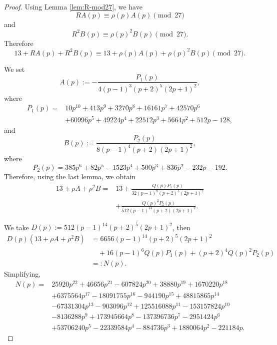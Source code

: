 \documentclass[10pt,a4paper]{amsart}
\begin{document}
\begin{proof}
Using Lemma \ref{lem:R-mod27}, we have
\begin{equation*}
RA(p)\equiv\rho(p)A(p)\pmod{27}
\end{equation*}
and
\begin{equation*}
R^2B(p)\equiv\rho(p)^2B(p)\pmod{27}.
\end{equation*}
Therefore
\begin{equation*}
13+RA(p)+R^2B(p)
\equiv
13+\rho(p)A(p)+\rho(p)^2B(p)
\pmod{27}.
\end{equation*}

We set
\begin{equation*}
A(p):=-\frac{P_1(p)}{4(p-1)^3(p+2)^5(2p+1)^2},
\end{equation*}
where
\begin{align*}
P_1(p)
={}&
10p^{10}
+413p^9
+3270p^8
+16161p^7
+42570p^6
\\
&+
60996p^5
+49224p^4
+22512p^3
+5664p^2
+512p
-128,
\end{align*}
and
\begin{equation*}
B(p):=\frac{P_2(p)}{8(p-1)^4(p+2)(2p+1)^2},
\end{equation*}
where
\begin{equation*}
P_2(p)
=
385p^6
+82p^5
-1523p^4
+500p^3
+836p^2
-232p
-192.
\end{equation*}
Therefore, using the last lemma, we obtain
\begin{align*}
13+\rho A+\rho^2B
={}&
13
+
\frac{Q(p)P_1(p)}
{32(p-1)^8(p+2)^5(2p+1)^2}
\\
&+
\frac{Q(p)^2P_2(p)}
{512(p-1)^{14}(p+2)(2p+1)^2}.
\end{align*}

We take $D(p):=512(p-1)^{14}(p+2)^5(2p+1)^2$, then
\begin{align*}
D(p)\left(13+\rho A+\rho^2B\right)
&=
6656(p-1)^{14}(p+2)^5(2p+1)^2
\\
&\quad
+
16(p-1)^6Q(p)P_1(p)
+
(p+2)^4Q(p)^2P_2(p)
\\
&=:N(p).
\end{align*}
Simplifying,
\iffalse
\begin{align*}
N(p)
={}&
25920p^{22}
+46656p^{21}
-607824p^{20}
+38880p^{19}
+1670220p^{18}
\\
&+
6375564p^{17}
-18091755p^{16}
-944190p^{15}
+48815865p^{14}
\\
&-
67331304p^{13}
-903096p^{12}
+125516088p^{11}
-153157824p^{10}
\\
&-
8136288p^9
+173945664p^8
-137396736p^7
-2951424p^6
\\
&+
53706240p^5
-22339584p^4
-884736p^3
+1880064p^2
-221184p.
\end{align*}


\end{proof}
\end{document}
